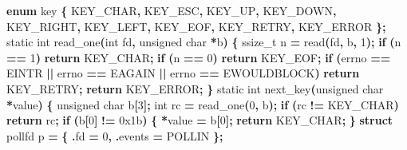 \documentclass[
  oneside,
  openany]{book}
\newenvironment{Shaded}{\begin{snugshade}}{\end{snugshade}}
\newcommand{\BaseNTok}[1]{\textcolor[rgb]{0.00,0.00,0.81}{#1}}
\newcommand{\ControlFlowTok}[1]{\textcolor[rgb]{0.13,0.29,0.53}{\textbf{#1}}}
\newcommand{\DataTypeTok}[1]{\textcolor[rgb]{0.13,0.29,0.53}{#1}}
\newcommand{\DecValTok}[1]{\textcolor[rgb]{0.00,0.00,0.81}{#1}}
\newcommand{\KeywordTok}[1]{\textcolor[rgb]{0.13,0.29,0.53}{\textbf{#1}}}
\newcommand{\NormalTok}[1]{#1}
\newcommand{\OperatorTok}[1]{\textcolor[rgb]{0.81,0.36,0.00}{\textbf{#1}}}
\begin{document}
\begin{Shaded}
\begin{Highlighting}[]
\KeywordTok{enum}\NormalTok{ key }\OperatorTok{\{}\NormalTok{ KEY\_CHAR}\OperatorTok{,}\NormalTok{ KEY\_ESC}\OperatorTok{,}\NormalTok{ KEY\_UP}\OperatorTok{,}\NormalTok{ KEY\_DOWN}\OperatorTok{,}\NormalTok{ KEY\_RIGHT}\OperatorTok{,}\NormalTok{ KEY\_LEFT}\OperatorTok{,}
\NormalTok{           KEY\_EOF}\OperatorTok{,}\NormalTok{ KEY\_RETRY}\OperatorTok{,}\NormalTok{ KEY\_ERROR }\OperatorTok{\};}
\DataTypeTok{static} \DataTypeTok{int}\NormalTok{ read\_one}\OperatorTok{(}\DataTypeTok{int}\NormalTok{ fd}\OperatorTok{,} \DataTypeTok{unsigned} \DataTypeTok{char} \OperatorTok{*}\NormalTok{b}\OperatorTok{)} \OperatorTok{\{}
    \DataTypeTok{ssize\_t}\NormalTok{ n }\OperatorTok{=}\NormalTok{ read}\OperatorTok{(}\NormalTok{fd}\OperatorTok{,}\NormalTok{ b}\OperatorTok{,} \DecValTok{1}\OperatorTok{);}
    \ControlFlowTok{if} \OperatorTok{(}\NormalTok{n }\OperatorTok{==} \DecValTok{1}\OperatorTok{)} \ControlFlowTok{return}\NormalTok{ KEY\_CHAR}\OperatorTok{;}
    \ControlFlowTok{if} \OperatorTok{(}\NormalTok{n }\OperatorTok{==} \DecValTok{0}\OperatorTok{)} \ControlFlowTok{return}\NormalTok{ KEY\_EOF}\OperatorTok{;}
    \ControlFlowTok{if} \OperatorTok{(}\NormalTok{errno }\OperatorTok{==}\NormalTok{ EINTR }\OperatorTok{||}\NormalTok{ errno }\OperatorTok{==}\NormalTok{ EAGAIN }\OperatorTok{||}\NormalTok{ errno }\OperatorTok{==}\NormalTok{ EWOULDBLOCK}\OperatorTok{)}
        \ControlFlowTok{return}\NormalTok{ KEY\_RETRY}\OperatorTok{;}
    \ControlFlowTok{return}\NormalTok{ KEY\_ERROR}\OperatorTok{;}
\OperatorTok{\}}
\DataTypeTok{static} \DataTypeTok{int}\NormalTok{ next\_key}\OperatorTok{(}\DataTypeTok{unsigned} \DataTypeTok{char} \OperatorTok{*}\NormalTok{value}\OperatorTok{)} \OperatorTok{\{}
    \DataTypeTok{unsigned} \DataTypeTok{char}\NormalTok{ b}\OperatorTok{[}\DecValTok{3}\OperatorTok{];} \DataTypeTok{int}\NormalTok{ rc }\OperatorTok{=}\NormalTok{ read\_one}\OperatorTok{(}\DecValTok{0}\OperatorTok{,}\NormalTok{ b}\OperatorTok{);}
    \ControlFlowTok{if} \OperatorTok{(}\NormalTok{rc }\OperatorTok{!=}\NormalTok{ KEY\_CHAR}\OperatorTok{)} \ControlFlowTok{return}\NormalTok{ rc}\OperatorTok{;}
    \ControlFlowTok{if} \OperatorTok{(}\NormalTok{b}\OperatorTok{[}\DecValTok{0}\OperatorTok{]} \OperatorTok{!=} \BaseNTok{0x1b}\OperatorTok{)} \OperatorTok{\{} \OperatorTok{*}\NormalTok{value }\OperatorTok{=}\NormalTok{ b}\OperatorTok{[}\DecValTok{0}\OperatorTok{];} \ControlFlowTok{return}\NormalTok{ KEY\_CHAR}\OperatorTok{;} \OperatorTok{\}}
    \KeywordTok{struct}\NormalTok{ pollfd p }\OperatorTok{=} \OperatorTok{\{} \OperatorTok{.}\NormalTok{fd }\OperatorTok{=} \DecValTok{0}\OperatorTok{,} \OperatorTok{.}\NormalTok{events }\OperatorTok{=}\NormalTok{ POLLIN }\OperatorTok{\};}

\end{Highlighting}
\end{Shaded}
\end{document}
